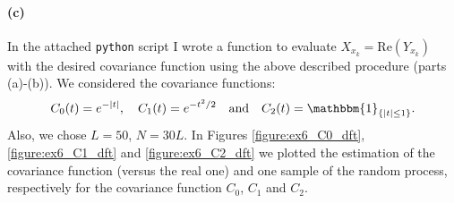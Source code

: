 \documentclass[a4paper,11pt]{article}
\theoremstyle{definition}
\theoremstyle{plain}
\theoremstyle{remark}
\DeclarePairedDelimiter{\abs}{\lvert}{\rvert}
\DeclarePairedDelimiter{\bra}{\lbrace}{\rbrace}
\begin{document}
\paragraph*{(c)}

In the attached \texttt{python} script I wrote a function to evaluate $X_{x_k} = \mathrm{Re}(Y_{x_k})$ with the desired covariance function using the above described procedure (parts (a)-(b)).
We considered the covariance functions:
$$
C_0(t) = e^{-\abs{t}}, \quad C_1(t) = e^{-t^2/2} \quad \text{and} \quad C_2(t) = \mathbbm{1}_{\bra{\abs{t}\leq1}}. 
$$
Also, we chose $L=50$, $N=30 L$. In Figures \ref{figure:ex6_C0_dft}, \ref{figure:ex6_C1_dft} and \ref{figure:ex6_C2_dft} we plotted the estimation of the covariance function (versus the real one) and one sample of the random process, respectively for the covariance function $C_0$, $C_1$ and $C_2$.
\end{document}
